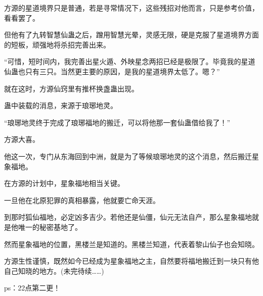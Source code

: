 \begin{this_body}
方源的星道境界只是普通，若是寻常情况下，这些残招对他而言，只是参考价值，看看罢了。

但他有了九转智慧仙蛊之后，蹭用智慧光晕，灵感无限，硬是克服了星道境界方面的短板，顽强地将杀招完善出来。

“可惜，短时间内，我完善出星火遁、外映星念两招已经是极限了。毕竟我的星道仙蛊也只有三只。当然更主要的原因，是我的星道境界太低了。嗯？”

就在这时，方源仙窍里有推杯换盏蛊出现。

蛊中装载的消息，来源于琅琊地灵。

“琅琊地灵终于完成了琅琊福地的搬迁，可以将他那一套仙蛊借给我了！”

方源大喜。

他这一次，专门从东海回到中洲，就是为了等候琅琊地灵的这个消息，然后搬迁星象福地。

在方源的计划中，星象福地相当关键。

一旦他在北原犯罪的真相暴露，他就要亡命天涯。

到那时狐仙福地，必定凶多吉少。若他还是仙僵，仙元无法自产，那么星象福地就是他唯一的秘密基地了。

然而星象福地的位置，黑楼兰是知道的。黑楼兰知道，代表着黎山仙子也会知晓。

方源生性谨慎，既然如今已经成为星象福地之主，自然要将福地搬迁到一块只有他自己知晓的地方。(未完待续……)

ps：22点第二更！

\end{this_body}

